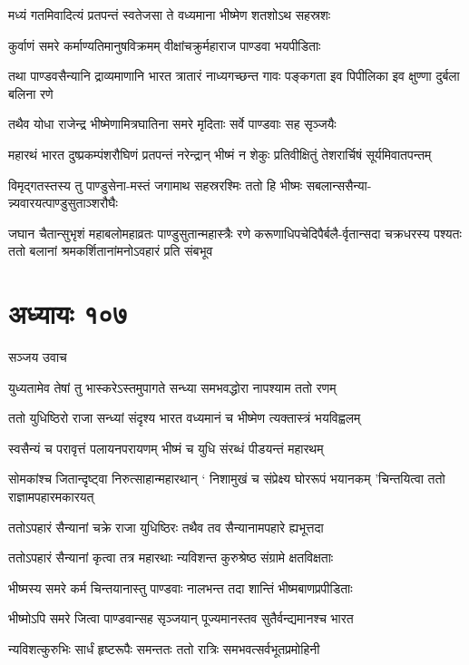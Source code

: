 \twolineshloka
{मध्यं गतमिवादित्यं प्रतपन्तं स्वतेजसा}
{ते वध्यमाना भीष्मेण शतशोऽथ सहस्रशः}


\twolineshloka
{कुर्वाणं समरे कर्माण्यतिमानुषविक्रमम्}
{वीक्षांचक्रुर्महाराज पाण्डवा भयपीडिताः}


\threelineshloka
{तथा पाण्डवसैन्यानि द्राव्यमाणानि भारत}
{त्रातारं नाध्यगच्छन्त गावः पङ्कगता इव}
{पिपीलिका इव क्षुण्णा दुर्बला बलिना रणे}


\twolineshloka
{तथैव योधा राजेन्द्र भीष्मेणामित्रघातिना}
{समरे मृदिताः सर्वे पाण्डवाः सह सृञ्जयैः}


\twolineshloka
{महारथं भारत दुष्प्रकम्पंशरौघिणं प्रतपन्तं नरेन्द्रान्}
{भीष्मं न शेकुः प्रतिवीक्षितुं तेशरार्चिषं सूर्यमिवातपन्तम्}


\twolineshloka
{विमृद्गतस्तस्य तु पाण्डुसेना-मस्तं जगामाथ सहस्ररश्मिः}
{ततो हि भीष्मः सबलान्ससैन्या-न्न्यवारयत्पाण्डुसुताञ्शरौघैः}


\threelineshloka
{जघान चैतान्सुभृशं महाबलोमहाव्रतः पाण्डुसुतान्महास्त्रैः}
{रणे करूणाधिपचेदिपैर्बलै-र्वृतान्सदा चक्रधरस्य पश्यतः}
{ततो बलानां श्रमकर्शितानांमनोऽवहारं प्रति संबभूव}


\chapter{अध्यायः १०७}
\twolineshloka
{सञ्जय उवाच}
{}


\twolineshloka
{युध्यतामेव तेषां तु भास्करेऽस्तमुपागते}
{सन्ध्या समभवद्धोरा नापश्याम ततो रणम्}


\twolineshloka
{ततो युधिष्ठिरो राजा सन्ध्यां संदृश्य भारत}
{वध्यमानं च भीष्मेण त्यक्तास्त्रं भयविह्वलम्}


\twolineshloka
{स्वसैन्यं च परावृत्तं पलायनपरायणम्}
{भीष्मं च युधि संरब्धं पीडयन्तं महारथम्}


\threelineshloka
{सोमकांश्च जितान्दृष्ट्वा निरुत्साहान्महारथान्}
{` निशामुखं च संप्रेक्ष्य घोररूपं भयानकम्}
{'चिन्तयित्वा ततो राज्ञामपहारमकारयत्}


\twolineshloka
{ततोऽपहारं सैन्यानां चक्रे राजा युधिष्ठिरः}
{तथैव तव सैन्यानामपहारे ह्यभूत्तदा}


\twolineshloka
{ततोऽपहारं सैन्यानां कृत्वा तत्र महारथाः}
{न्यविशन्त कुरुश्रेष्ठ संग्रामे क्षतविक्षताः}


\twolineshloka
{भीष्मस्य समरे कर्म चिन्तयानास्तु पाण्डवाः}
{नालभन्त तदा शान्तिं भीष्मबाणप्रपीडिताः}


\twolineshloka
{भीष्मोऽपि समरे जित्वा पाण्डवान्सह सृञ्जयान्}
{पूज्यमानस्तव सुतैर्वन्द्यमानश्च भारत}


\twolineshloka
{न्यविशत्कुरुभिः सार्धं हृष्टरूपैः समन्ततः}
{ततो रात्रिः समभवत्सर्वभूतप्रमोहिनी}


